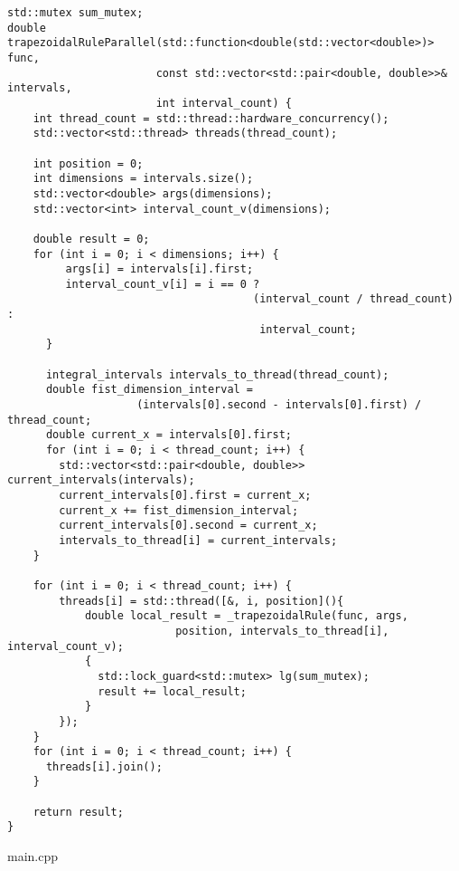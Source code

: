 \documentclass{report}
\begin{document}
\begin{lstlisting}
std::mutex sum_mutex;
double trapezoidalRuleParallel(std::function<double(std::vector<double>)> func,
                       const std::vector<std::pair<double, double>>& intervals,
                       int interval_count) {
    int thread_count = std::thread::hardware_concurrency();
    std::vector<std::thread> threads(thread_count);

    int position = 0;
    int dimensions = intervals.size();
    std::vector<double> args(dimensions);
    std::vector<int> interval_count_v(dimensions);

    double result = 0;
    for (int i = 0; i < dimensions; i++) {
         args[i] = intervals[i].first;
         interval_count_v[i] = i == 0 ?
                                      (interval_count / thread_count) :
                                       interval_count;
      }

      integral_intervals intervals_to_thread(thread_count);
      double fist_dimension_interval =
                    (intervals[0].second - intervals[0].first) / thread_count;
      double current_x = intervals[0].first;
      for (int i = 0; i < thread_count; i++) {
        std::vector<std::pair<double, double>> current_intervals(intervals);
        current_intervals[0].first = current_x;
        current_x += fist_dimension_interval;
        current_intervals[0].second = current_x;
        intervals_to_thread[i] = current_intervals;
    }

    for (int i = 0; i < thread_count; i++) {
        threads[i] = std::thread([&, i, position](){
            double local_result = _trapezoidalRule(func, args,
                          position, intervals_to_thread[i], interval_count_v);
            {
              std::lock_guard<std::mutex> lg(sum_mutex);
              result += local_result;
            }
        });
    }
    for (int i = 0; i < thread_count; i++) {
      threads[i].join();
    }

    return result;
}
\end{lstlisting}
main.cpp
\end{document}
